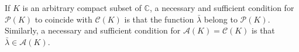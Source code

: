If $K$ is an arbitrary compact subset of $\mathbb{C}$, a necessary and sufficient condition for $\mathcal{P}(K)$ to coincide with $\mathcal{C}(K)$ is that the function $\bar{\lambda}$ belong to $\mathcal{P}(K)$. Similarly, a necessary and sufficient condition for $\mathcal{A}(K) = \mathcal{C}(K)$ is that $\bar{\lambda} \in \mathcal{A}(K)$.
